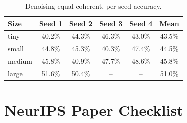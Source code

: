 \documentclass{article}
\begin{document}
\begin{table}[h]
\centering
\small
\begin{tabular}{lccccc}
\toprule
Size & Seed 1 & Seed 2 & Seed 3 & Seed 4 & Mean \\
\midrule
tiny   & 40.2\% & 44.3\% & 46.3\% & 43.0\% & 43.5\% \\
small  & 44.8\% & 45.3\% & 40.3\% & 47.4\% & 44.5\% \\
medium & 45.8\% & 40.9\% & 47.7\% & 48.6\% & 45.8\% \\
large  & 51.6\% & 50.4\% & --     & --     & 51.0\% \\
\bottomrule
\end{tabular}
\caption{Denoising equal coherent, per-seed accuracy.}
\label{tab:seeds_coherent}
\end{table}

\section*{NeurIPS Paper Checklist}
\end{document}
